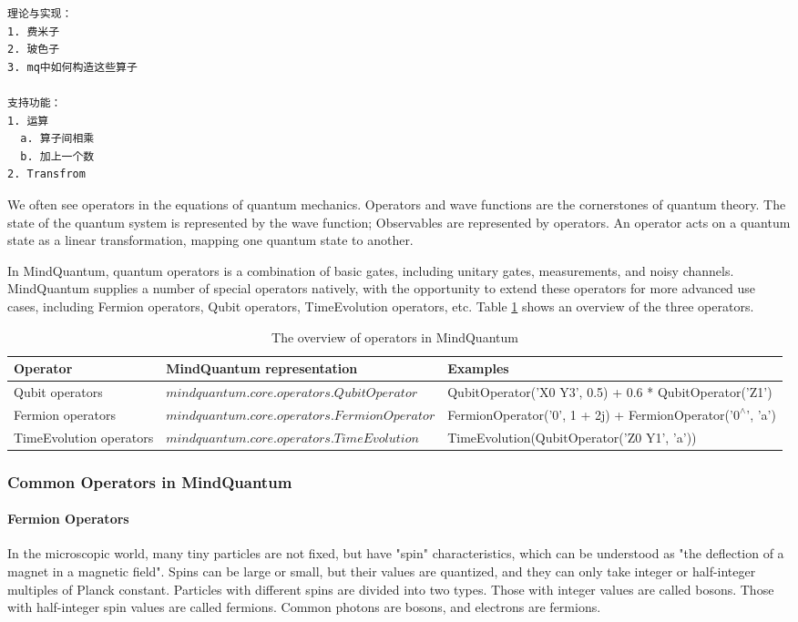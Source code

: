 \begin{lstlisting}
理论与实现：
1. 费米子
2. 玻色子
3. mq中如何构造这些算子

支持功能：
1. 运算
  a. 算子间相乘
  b. 加上一个数
2. Transfrom
\end{lstlisting}

We often see operators in the equations of quantum mechanics. Operators and wave functions are the cornerstones of quantum theory. The state of the quantum system is represented by the wave function; Observables are represented by operators. An operator acts on a quantum state as a linear transformation, mapping one quantum state to another. 

In MindQuantum, quantum operators is a combination of basic gates, including unitary gates, measurements, and noisy channels. MindQuantum supplies a number of special operators natively, with the opportunity to extend these operators for more advanced use cases, including Fermion operators, Qubit operators, TimeEvolution operators, etc. Table \ref{operators_table} shows an overview of the three operators. 

\begin{table}[htbp]
\centering
\caption{The overview of operators in MindQuantum}
\label{operators_table}  %
    \begin{tabular}[htbp]{l|l|l}
        \textbf{Operator} &\textbf{MindQuantum representation} &\textbf{Examples} \\
        \hline
        Qubit operators &$mindquantum.core.operators.QubitOperator$ &QubitOperator('X0 Y3', 0.5) + 0.6 * QubitOperator('Z1') \\ 
        Fermion operators &$mindquantum.core.operators.FermionOperator$ &FermionOperator('0', 1 + 2j) + FermionOperator('$0^{\wedge}$', 'a') \\ 
        TimeEvolution operators &$mindquantum.core.operators.TimeEvolution$ &TimeEvolution(QubitOperator('Z0 Y1', 'a')) \\ 
        \hline
    \end{tabular}
\end{table}


\subsubsection{Common Operators in MindQuantum}
\paragraph{Fermion Operators}
In the microscopic world, many tiny particles are not fixed, but have "spin" characteristics, which can be understood as "the deflection of a magnet in a magnetic field". Spins can be large or small, but their values are quantized, and they can only take integer or half-integer multiples of Planck constant. Particles with different spins are divided into two types. Those with integer values are called bosons. Those with half-integer spin values are called fermions. Common photons are bosons, and electrons are fermions. 

